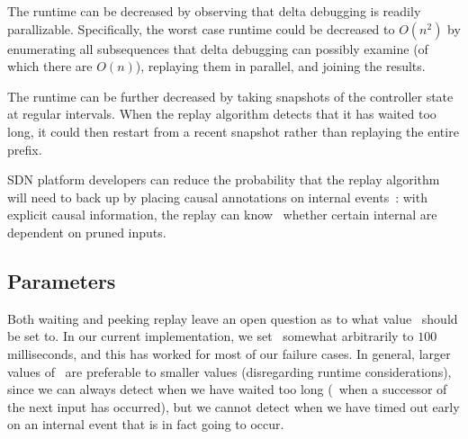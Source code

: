 The runtime can be decreased by observing that delta debugging is readily
parallizable. Specifically, the worst case runtime could be
decreased to $O(n^2)$ by enumerating all subsequences that delta debugging
can possibly examine (of which there are $O(n)$), replaying them in parallel, and joining the
results.

The runtime can be further decreased by taking snapshots of the controller
state at regular intervals. When the replay algorithm detects that it has waited too
long, it could then restart from a recent snapshot rather than replaying the
entire prefix.

SDN platform developers can reduce the probability that the replay algorithm
will need to back up by placing causal annotations on internal
events~\cite{fonseca2007x}: with explicit causal information, the replay can know
\apriori~whether certain internal are dependent on pruned inputs.


\subsection{Parameters}
\label{subsec:params}

Both waiting and peeking replay leave an open question as to what value
\textepsilon~should be set to. In our current implementation,
we set \textepsilon~\num{somewhat arbitrarily} to $100$ milliseconds, and this has worked for \num{most} of our
failure cases. In general, larger values of \textepsilon~are preferable to
smaller values (disregarding runtime considerations), since we can always
detect when we have waited too long (\viz~when a successor of the next input
has occurred), but we cannot detect when we have timed out
early on an internal event that is in fact going to occur.



